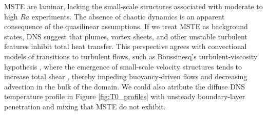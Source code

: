 \documentclass[reprint,amsmath,amssymb,aps]{revtex4-1}
\begin{document}
MSTE are laminar, lacking the small-scale structures associated with moderate to high $Ra$ experiments. The absence of chaotic dynamics is an apparent consequence of the quasilinear assumptions. If we treat MSTE as background states, DNS suggest that plumes, vortex sheets, and other unstable turbulent features inhibit total heat transfer. This perspective agrees with convectional models of transitions to turbulent flows, such as Boussinesq's turbulent-viscosity hypothesis \cite{boussinesq_1877}, where the emergence of small-scale velocity structures tends to increase total shear \cite{Lecoanet_KH, drazin_reid_2004, pope_2000}, thereby impeding buoyancy-driven flows and decreasing advection in the bulk of the domain. We could also atribute the diffuse DNS temperature profile in Figure \ref{fig:T0_profiles} with unsteady boundary-layer penetration and mixing that MSTE do not exhibit.
\end{document}
